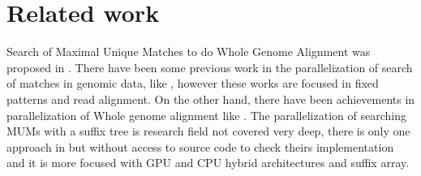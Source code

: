 \documentclass[3p,times]{elsarticle}
\begin{document}
\section{Related work}
Search of Maximal Unique Matches to do Whole Genome Alignment was proposed in \cite{Delcher1999}. There have been some previous work in the parallelization of search of matches in genomic data, like \cite{OguzhanKulekci2011,Mongelli,Kouzinopoulos2005}, however these works are focused in fixed patterns and read alignment. On the other hand, there have been achievements in parallelization of Whole genome alignment like \cite{Meng2005}. The parallelization of searching MUMs with a suffix tree is research field not covered very deep, there is only one approach in \cite{Encarnac2011} but without access to source code to check theirs implementation and it is more focused with GPU and CPU hybrid architectures and suffix array.
\end{document}
